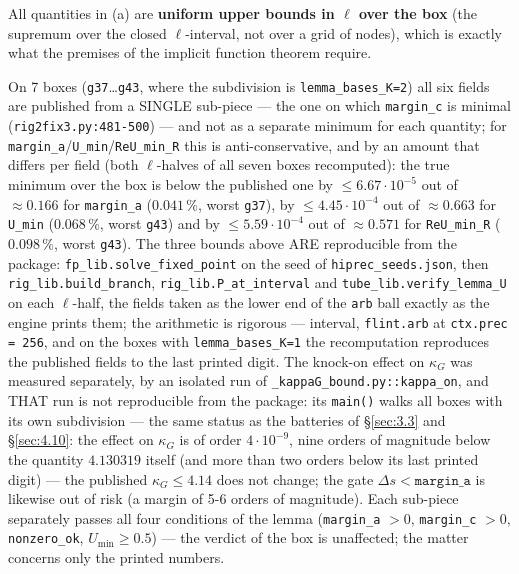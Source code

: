 All quantities in (a) are \textbf{uniform upper bounds in $\ell$ over the box}
(the supremum over the closed $\ell$-interval, not over a grid of nodes), which
is exactly what the premises of the implicit function theorem require.

On 7 boxes (\texttt{g37}\ldots\texttt{g43}, where the subdivision is
\texttt{lemma\_\allowbreak bases\_\allowbreak K=2}) all six fields are published from a SINGLE
sub-piece --- the one on which \texttt{margin\_c} is minimal
(\texttt{rig2fix3.py:481-500}) --- and not as a separate minimum for each
quantity; for \texttt{margin\_a}/\texttt{U\_min}/\texttt{ReU\_min\_R} this is
anti-conservative, and by an amount that differs per field (both $\ell$-halves of all seven boxes recomputed): the true minimum over the box is below the published one by $\le 6.67\cdot10^{-5}$ out of $\approx0.166$ for \texttt{margin\_a} ($0.041\,\%$, worst \texttt{g37}), by $\le 4.45\cdot10^{-4}$ out of $\approx0.663$ for \texttt{U\_min} ($0.068\,\%$, worst \texttt{g43}) and by $\le 5.59\cdot10^{-4}$ out of $\approx0.571$ for \texttt{ReU\_min\_R} ($0.098\,\%$, worst \texttt{g43}).
The three bounds above ARE reproducible from the package: \texttt{fp\_\allowbreak lib.\allowbreak solve\_\allowbreak fixed\_\allowbreak point} on the seed of \texttt{hiprec\_\allowbreak seeds.\allowbreak json}, then \texttt{rig\_\allowbreak lib.\allowbreak build\_\allowbreak branch}, \texttt{rig\_\allowbreak lib.\allowbreak P\_\allowbreak at\_\allowbreak interval} and \texttt{tube\_\allowbreak lib.\allowbreak verify\_\allowbreak lemma\_\allowbreak U} on each $\ell$-half, the fields taken as the lower end of the \texttt{arb} ball exactly as the engine prints them; the arithmetic is rigorous --- interval, \texttt{flint.arb} at \texttt{ctx.prec = 256}, and on the boxes with \texttt{lemma\_\allowbreak bases\_\allowbreak K=1} the recomputation reproduces the published fields to the last printed digit. The knock-on effect on $\kappa_G$ was measured separately, by an isolated run of \texttt{\_\allowbreak kappaG\_\allowbreak bound.py::\allowbreak kappa\_\allowbreak on}, and THAT run is not reproducible from the package: its \texttt{main()} walks all boxes with its own subdivision --- the same status as the batteries of \S\ref{sec:3.3} and \S\ref{sec:4.10}: the
effect on $\kappa_G$ is of order $4\cdot10^{-9}$, nine orders of magnitude
below the quantity $4.130319$ itself (and more than two orders below its last
printed digit) --- the published $\kappa_G\le4.14$ does not change; the gate
$\Delta s < \mathtt{margin\_a}$ is likewise out of risk (a margin of 5-6 orders
of magnitude). Each sub-piece separately passes all four conditions of the
lemma (\texttt{margin\_a} $> 0$, \texttt{margin\_c} $> 0$, \texttt{nonzero\_ok},
$U_{\min}\ge0.5$) --- the verdict of the box is unaffected; the matter
concerns only the printed numbers.


